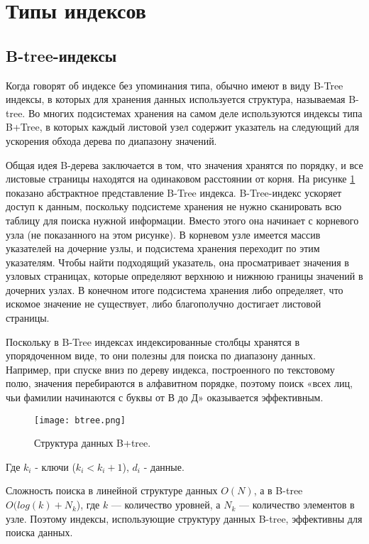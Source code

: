 \section{Типы индексов}

\subsection{B-tree-индексы}

Когда говорят об индексе без упоминания типа, обычно имеют в виду B-Tree индексы, в которых для хранения данных используется структура, называемая B-tree. Во многих подсистемах хранения на самом деле используются индексы типа B+Tree, в которых каждый листовой узел содержит указатель на следующий для ускорения обхода дерева по диапазону значений.

Общая идея B-дерева заключается в том, что значения хранятся по порядку, и все листовые страницы находятся на одинаковом расстоянии от корня. На рисунке \ref{img:btree-structure} показано абстрактное представление B-Tree индекса. B-Tree-индекс ускоряет доступ к данным, поскольку подсистеме хранения не нужно сканировать всю таблицу для поиска нужной информации. Вместо этого она начинает с корневого узла (не показанного на этом рисунке). В корневом узле имеется массив указателей на дочерние узлы, и подсистема хранения переходит по этим указателям. Чтобы найти подходящий указатель, она просматривает значения в узловых страницах, которые определяют верхнюю и нижнюю границы значений в дочерних узлах. В конечном итоге подсистема хранения либо определяет, что искомое значение не существует, либо благополучно достигает листовой страницы.

Поскольку в B-Tree индексах индексированные столбцы хранятся в упорядоченном виде, то они полезны для поиска по диапазону данных. Например, при спуске вниз по дереву индекса, построенного по текстовому полю, значения перебираются в алфавитном порядке, поэтому поиск «всех лиц, чьи фамилии начинаются с буквы от В до Д» оказывается эффективным.

\begin{figure}[H]
  \centering
  \texttt{[image: btree.png]}
  \caption{Структура данных B+tree.}
  \label{img:btree-structure}
\end{figure}

Где $k_i$ - ключи ($k_i < k_i + 1$), $d_i$ - данные.

Сложность поиска в линейной структуре данных $O(N)$, а в B-tree $O(log(k)+N_k$), где $k$ — количество уровней, а $N_k$ — количество элементов в узле. Поэтому индексы, использующие структуру данных B-tree, эффективны для поиска данных. 

